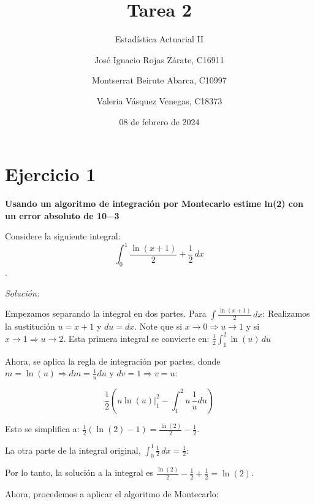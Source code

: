 \documentclass[
]{article}
\title{Tarea 2}
\subtitle{Estadística Actuarial II}
\author{José Ignacio Rojas Zárate, C16911 \and Montserrat Beirute
Abarca, C10997 \and Valeria Vásquez Venegas, C18373}
\date{08 de febrero de 2024}
\begin{document}
\maketitle

{
\setcounter{tocdepth}{2}
\tableofcontents
}
\newpage

\hypertarget{ejercicio-1}{%
\section{Ejercicio 1}\label{ejercicio-1}}

\textbf{Usando un algoritmo de integración por Montecarlo estime ln(2)
con un error absoluto de 10−3}

Considere la siguiente integral:
\[ \int_{0}^{1} \frac{\ln(x + 1)}{2} + \frac{1}{2} \, dx \].

\emph{Solución:}

Empezamos separando la integral en dos partes. Para
\(\int \frac{\ln(x + 1)}{2} \, dx\): Realizamos la sustitución
\(u = x + 1\) y \(du = dx\). Note que si
\(x \rightarrow 0 \Rightarrow u \rightarrow 1\) y si
\(x \rightarrow 1 \Rightarrow u \rightarrow 2\). Esta primera integral
se convierte en: \(\frac{1}{2} \int_{1}^{2} \ln(u) \, du\)

Ahora, se aplica la regla de integración por partes, donde
\(m = \ln(u) \Rightarrow dm = \frac{1}{u} du\) y
\(dv = 1 \Rightarrow v = u\):

\[ \frac{1}{2} \left( u \ln(u) \Big|_{1}^2 - \int_{1}^{2} u \, \frac{1}{u} du\right) \]

Esto se simplifica a:
\(\frac{1}{2} \left(\ln(2) - 1 \right) = \frac{\ln(2)}{2} - \frac{1}{2}\).

La otra parte de la integral original,
\(\int_{0}^{1} \frac{1}{2} \, dx = \frac{1}{2}\):

Por lo tanto, la solución a la integral es
\(\frac{\ln(2)}{2} - \frac{1}{2} + \frac{1}{2} = \ln(2)\).

Ahora, procedemos a aplicar el algoritmo de Montecarlo:
\end{document}

